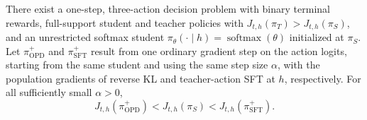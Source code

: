 \begin{proposition}
\label{prop:corrective_supervision}
There exist a one-step, three-action decision problem with binary terminal rewards, full-support student and teacher policies with $J_{t,h}(\pi_T)>J_{t,h}(\pi_S)$, and an unrestricted softmax student $\pi_\theta(\cdot\mid h)=\operatorname{softmax}(\theta)$ initialized at $\pi_S$. Let $\pi_{\mathrm{OPD}}^+$ and $\pi_{\mathrm{SFT}}^+$ result from one ordinary gradient step on the action logits, starting from the same student and using the same step size $\alpha$, with the population gradients of reverse KL and teacher-action SFT at $h$, respectively. For all sufficiently small $\alpha>0$,
\begin{equation}
J_{t,h}(\pi_{\mathrm{OPD}}^+)
<J_{t,h}(\pi_S)
<J_{t,h}(\pi_{\mathrm{SFT}}^+).
\label{eq:corrective_supervision_separation}
\end{equation}
\end{proposition}


